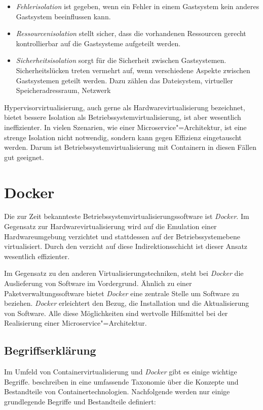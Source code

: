 \begin{itemize}
	\item \textit{Fehlerisolation} ist gegeben, wenn ein Fehler in einem Gastsystem kein anderes Gastsystem beeinflussen kann.
	\item \textit{Ressourcenisolation} stellt sicher, dass die vorhandenen Ressourcen gerecht \bzw kontrollierbar auf die Gastsysteme aufgeteilt werden.
	\item \textit{Sicherheitsisolation} sorgt für die Sicherheit zwischen Gastsystemen. Sicherheitslücken treten vermehrt auf, wenn verschiedene Aspekte zwischen Gastsystemen geteilt werden. Dazu zählen \zB das Dateisystem, virtueller Speicheradressraum, Netzwerk \usw
\end{itemize}

Hypervisorvirtualisierung, auch gerne als Hardwarevirtualisierung bezeichnet, bietet bessere Isolation als Betriebssystemvirtualisierung, ist aber wesentlich ineffizienter. In vielen Szenarien, wie einer Microservice"=Architektur, ist eine strenge Isolation nicht notwendig, sondern kann gegen Effizienz eingetauscht werden. Darum ist Betriebssystemvirtualisierung mit Containern in diesen Fällen gut geeignet.

\section{Docker}

Die zur Zeit bekannteste Betriebssystemvirtualisierungssoftware ist \textit{Docker}. Im Gegensatz zur Hardwarevirtualisierung wird auf die Emulation einer Hardwareumgebung verzichtet und stattdessen auf der Betriebssystemebene virtualisiert. Durch den verzicht auf diese Indirektionsschicht ist dieser Ansatz wesentlich effizienter.

Im Gegensatz zu den anderen Virtualisierungstechniken, steht bei \textit{Docker} die Auslieferung von Software im Vordergrund. Ähnlich zu einer Paketverwaltungssoftware bietet \textit{Docker} eine zentrale Stelle um Software zu beziehen. \textit{Docker} erleichtert den Bezug, die Installation und die Aktualisierung von Software. Alle diese Möglichkeiten sind wertvolle Hilfsmittel bei der Realisierung einer Microservice"=Architektur.

\subsection{Begriffserklärung}

Im Umfeld von Containervirtualisierung und \textit{Docker} gibt es einige wichtige Begriffe. \citeauthor{paper_ernst_containers} beschreiben in \cite{paper_ernst_containers} eine umfassende Taxonomie über die Konzepte und Bestandteile von Containertechnologien. Nachfolgende werden nur einige grundlegende Begriffe und Bestandteile definiert:

